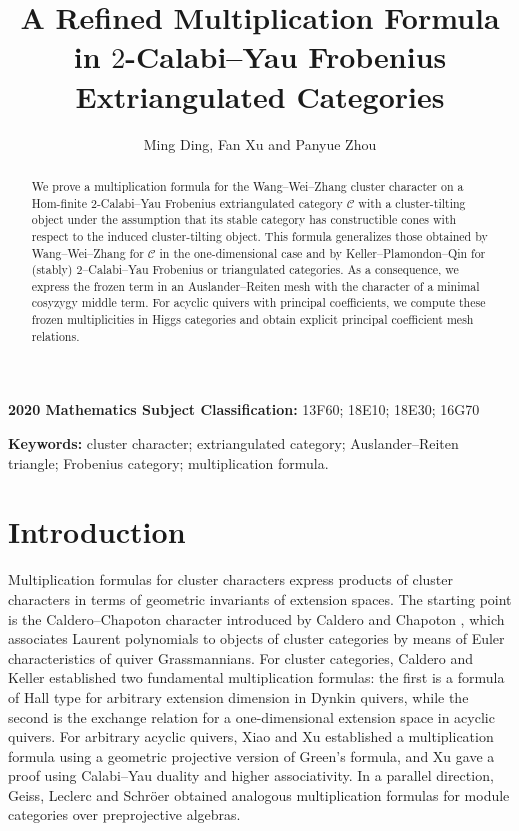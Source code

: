 \documentclass[11pt,reqno]{article}
\numberwithin{equation}{section}
\theoremstyle{definition}
\newcommand{\C}{\mathcal C}
\begin{document}
\title{\bf A Refined Multiplication Formula in
$2$-Calabi--Yau Frobenius Extriangulated Categories}
\author{Ming Ding, Fan Xu and Panyue Zhou}


\maketitle

\begin{abstract}
We prove a multiplication formula for  the Wang--Wei--Zhang cluster character on a Hom-finite $2$-Calabi--Yau Frobenius extriangulated category $\C$ with a cluster-tilting object under the  assumption that its stable category has constructible cones with respect to the induced cluster-tilting object.  This formula generalizes those obtained by Wang--Wei--Zhang for $\C$ in the one-dimensional case and by Keller--Plamondon--Qin for (stably) $2$--Calabi--Yau Frobenius or triangulated categories.  As a consequence, we express the frozen term in an Auslander--Reiten mesh with the character of a minimal cosyzygy
middle term.  For acyclic quivers with principal coefficients, we compute these frozen multiplicities in Higgs categories and obtain explicit principal coefficient mesh relations.
\end{abstract}

\medskip
\noindent\textbf{2020 Mathematics Subject Classification:}
13F60; 18E10; 18E30; 16G70
\vspace{2mm}

\noindent\textbf{Keywords:}
cluster character; extriangulated category; Auslander--Reiten triangle; Frobenius category; multiplication formula.

\section{Introduction}
Multiplication formulas for cluster characters express products of cluster characters in terms of geometric invariants of extension spaces.  The starting point is the Caldero--Chapoton character introduced by Caldero and Chapoton \cite{CalderoChapoton}, which associates Laurent polynomials to objects of cluster categories by means of Euler characteristics of quiver Grassmannians.  For cluster categories, Caldero and Keller \cite{CK,CalderoKeller} established two fundamental multiplication formulas: the first is a formula of Hall type for arbitrary extension dimension in Dynkin quivers, while the second is  the exchange relation for a one-dimensional extension space in acyclic quivers.  For arbitrary acyclic quivers, Xiao and Xu \cite{XiaoXu} established a multiplication formula using a geometric projective version of Green's formula, and Xu \cite{XuAcyclic} gave a proof using Calabi--Yau duality and higher associativity. In a parallel direction, Geiss, Leclerc and Schr\"oer \cite{GLS} obtained analogous multiplication formulas for module categories over preprojective algebras.
\end{document}
